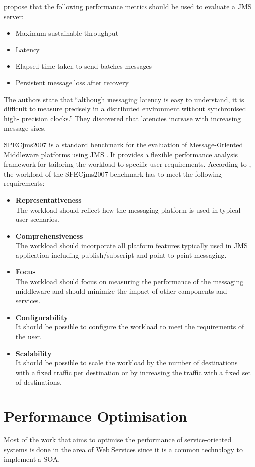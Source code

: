 \citet{Chen:2004cr} propose that the following performance metrics should be used to evaluate a JMS server:
\begin{itemize}
	\item Maximum sustainable throughput
	\item Latency
	\item Elapsed time taken to send batches messages
	\item Persistent message loss after recovery
\end{itemize}
The authors state that ``although messaging latency is easy to understand, it is difficult to measure precisely in a distributed environment without synchronised high- precision clocks.'' They discovered that latencies increase with increasing message sizes.

SPECjms2007 is a standard benchmark for the evaluation of Message-Oriented Middleware platforms using JMS \citep{Sachs:2009rr}. It provides a flexible performance analysis framework for tailoring the workload to specific user requirements. According to \citet{sachs2007designing}, the workload of the SPECjms2007 benchmark has to meet the following requirements:
\begin{itemize}
	\item \textbf{Representativeness}\\
	The workload should reflect how the messaging platform is used in typical user scenarios.
	\item \textbf{Comprehensiveness}\\
	The workload should incorporate all platform features typically used in JMS application including publish/subscript and point-to-point messaging.
	\item \textbf{Focus}\\
	The workload should focus on measuring the performance of the messaging middleware and should minimize the impact of other components and services.
	\item \textbf{Configurability}\\
	It should be possible to configure the workload to meet the requirements of the user.
	\item \textbf{Scalability}\\
	It should be possible to scale the workload by the number of destinations with a fixed traffic per destination or by increasing the traffic with a fixed set of destinations.
\end{itemize}
\section{Performance Optimisation}
Most of the work that aims to optimise the performance of service-oriented systems is done in the area of Web Services since it is a common technology to implement a SOA.

